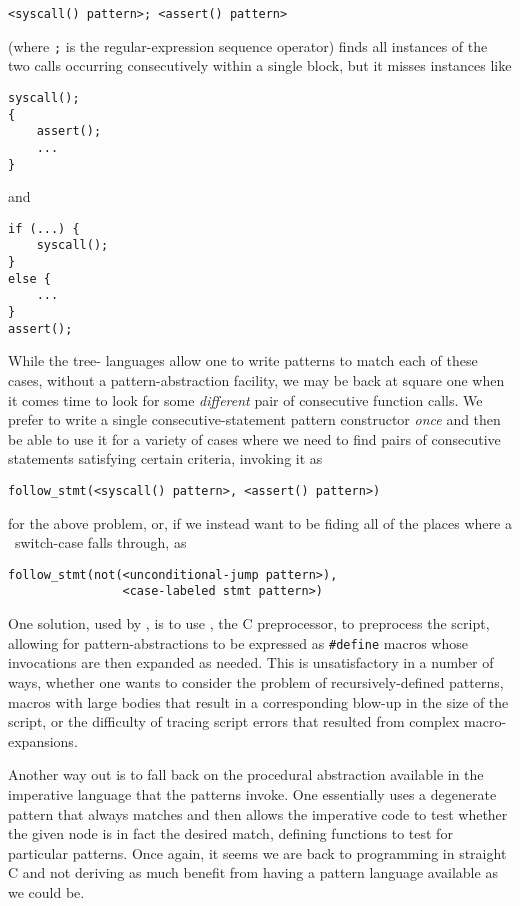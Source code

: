 \begin{verbatim}
<syscall() pattern>; <assert() pattern>
\end{verbatim}

\noindent
(where \verb|;| is the regular-expression sequence operator) finds all instances
of the two calls occurring consecutively within a single block, but it misses
instances like

\begin{verbatim}
syscall();
{
    assert();
    ...
}
\end{verbatim}

and

\begin{verbatim}
if (...) {
    syscall();
}
else {
    ...
}
assert();
\end{verbatim}

While the tree- languages allow one to write patterns to match each of
these cases, without a pattern-abstraction facility, we may be back at square
one when it comes time to look for some \emph{different} pair of consecutive
function calls. We prefer to write a single consecutive-statement pattern
constructor \emph{once} and then be able to use it for a variety of cases where
we need to find pairs of consecutive statements satisfying certain criteria,
invoking it as

\begin{verbatim}
follow_stmt(<syscall() pattern>, <assert() pattern>)
\end{verbatim}
for the above problem, or, if we instead want to be fiding all of the places
where a \ci\ switch-case falls through, as
\begin{verbatim}
follow_stmt(not(<unconditional-jump pattern>),
                <case-labeled stmt pattern>)
\end{verbatim}

One solution, used by , is to use , the C preprocessor, to
preprocess the script, allowing for pattern-abstractions to be expressed as
\verb|#define| macros whose invocations are then expanded as needed. This is
unsatisfactory in a number of ways, whether one wants to consider the problem of
recursively-defined patterns, macros with large bodies that result in a
corresponding blow-up in the size of the script, or the difficulty of tracing
script errors that resulted from complex macro-expansions.

Another way out is to fall back on the procedural abstraction available in the
imperative language that the patterns invoke. One essentially uses a degenerate
pattern that always matches and then allows the imperative code to test whether
the given node is in fact the desired match, defining functions to test for
particular patterns. Once again, it seems we are back to programming in straight
C and not deriving as much benefit from having a pattern language available as
we could be.


